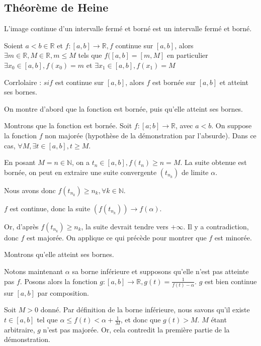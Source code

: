 \documentclass[french]{yLectureNote}
\begin{document}
\subsection{Théorème de Heine}
\begin{theorem}
L'image continue d'un intervalle fermé et borné est un intervalle fermé et borné.

Soient $ a<b \in\mathbb{R}$ et $f:[a,b] \to \mathbb{R}, f$ continue sur $[a,b]$, alors $\exists m\in\mathbb{R},M\in\mathbb{R}, m\leq M$ tels que $f([a,b] = [m,M]$ en particulier $\exists x_0\in[a,b], f(x_0) = m$ et $\exists x_1\in[a,b], f(x_1) = M$
\end{theorem}
Corrlolaire : $si f$ est continue sur $[a,b]$, alors $f$ est bornée sur $[a,b]$ et atteint ses bornes.
\begin{myproof}{}
On montre d'abord que la fonction est bornée, puis qu'elle atteint ses bornes.

Montrons que la fonction est bornée. Soit $f:[a;b]\to \mathbb{R}$, avec $a<b$. On suppose la fonction $f$ non majorée (hypothèse de la démonstration par l'absurde). Dans ce cas, $\forall M,\exists t \in[a,b], t\geq M$.

En posant $M=n\in\mathbb{N}$, on a $t_n\in[a,b],f(t_n) \geq n = M$. La suite obtenue est bornée, on peut en extraire une suite convergente $(t_{n_k})$ de limite $\alpha$.

Nous avons donc $f(t_{n_k}) \geq n_k, \forall k\in\mathbb{N}$.

$f$ est continue, donc la suite $(f(t_{n_k}))\to f(\alpha)$.

Or, d'après $f(t_{n_k}) \geq n_k$, la suite devrait tendre vers $+\infty$. Il y a contradiction, donc $f$ est majorée. On applique ce qui précède pour montrer que $f$ est minorée.

Montrons qu'elle atteint ses bornes.

Notons maintenant $\alpha$ sa borne inférieure et supposons qu'elle n'est pas atteinte pas $f$. Posons alors la fonction $\displaystyle g:[a,b] \to \mathbb{R}, g(t) = \frac{1}{f(t)-\alpha}$. $g$ est bien continue sur $[a,b]$ par composition.

Soit $M>0$ donné. Par définition de la borne inférieure, nous savons qu'il existe $t \in[a,b]$ tel que $\alpha\leq f(t)<\alpha+\frac{1}{M}$, et donc que $g(t) > M$. $M$ étant arbitraire, $g$ n'est pas majorée. Or, cela contredit la première partie de la démonstration.
\end{myproof}

\end{document}

